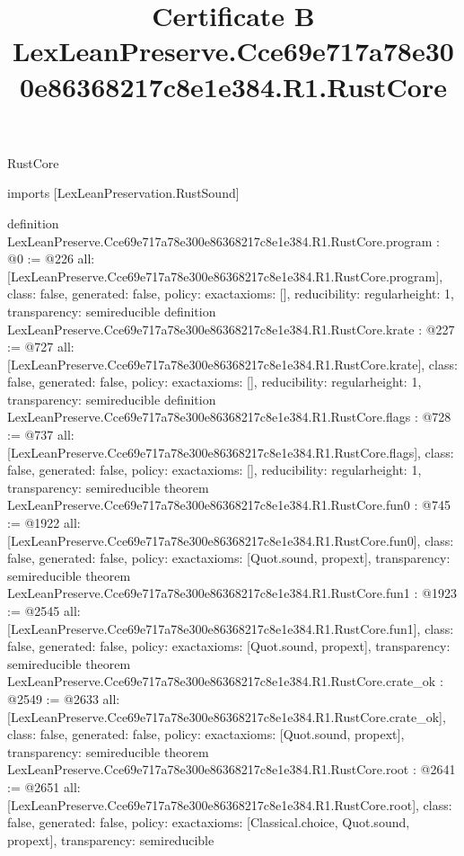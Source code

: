 \begin{lexlean}{RustCore}
\title{Certificate B LexLeanPreserve.Cce69e717a78e300e86368217c8e1e384.R1.RustCore}
\begin{coremodule}
imports [LexLeanPreservation.RustSound]

definition LexLeanPreserve.Cce69e717a78e300e86368217c8e1e384.R1.RustCore.program : @0 := @226 {
  all: [LexLeanPreserve.Cce69e717a78e300e86368217c8e1e384.R1.RustCore.program],
  class: false,
  generated: false,
  policy: exact{axioms: []},
  reducibility: regular{height: 1},
  transparency: semireducible
}
definition LexLeanPreserve.Cce69e717a78e300e86368217c8e1e384.R1.RustCore.krate : @227 := @727 {
  all: [LexLeanPreserve.Cce69e717a78e300e86368217c8e1e384.R1.RustCore.krate],
  class: false,
  generated: false,
  policy: exact{axioms: []},
  reducibility: regular{height: 1},
  transparency: semireducible
}
definition LexLeanPreserve.Cce69e717a78e300e86368217c8e1e384.R1.RustCore.flags : @728 := @737 {
  all: [LexLeanPreserve.Cce69e717a78e300e86368217c8e1e384.R1.RustCore.flags],
  class: false,
  generated: false,
  policy: exact{axioms: []},
  reducibility: regular{height: 1},
  transparency: semireducible
}
theorem LexLeanPreserve.Cce69e717a78e300e86368217c8e1e384.R1.RustCore.fun0 : @745 := @1922 {
  all: [LexLeanPreserve.Cce69e717a78e300e86368217c8e1e384.R1.RustCore.fun0],
  class: false,
  generated: false,
  policy: exact{axioms: [Quot.sound, propext]},
  transparency: semireducible
}
theorem LexLeanPreserve.Cce69e717a78e300e86368217c8e1e384.R1.RustCore.fun1 : @1923 := @2545 {
  all: [LexLeanPreserve.Cce69e717a78e300e86368217c8e1e384.R1.RustCore.fun1],
  class: false,
  generated: false,
  policy: exact{axioms: [Quot.sound, propext]},
  transparency: semireducible
}
theorem LexLeanPreserve.Cce69e717a78e300e86368217c8e1e384.R1.RustCore.crate_ok : @2549 := @2633 {
  all: [LexLeanPreserve.Cce69e717a78e300e86368217c8e1e384.R1.RustCore.crate_ok],
  class: false,
  generated: false,
  policy: exact{axioms: [Quot.sound, propext]},
  transparency: semireducible
}
theorem LexLeanPreserve.Cce69e717a78e300e86368217c8e1e384.R1.RustCore.root : @2641 := @2651 {
  all: [LexLeanPreserve.Cce69e717a78e300e86368217c8e1e384.R1.RustCore.root],
  class: false,
  generated: false,
  policy: exact{axioms: [Classical.choice, Quot.sound, propext]},
  transparency: semireducible
}


\end{coremodule}
\end{lexlean}
